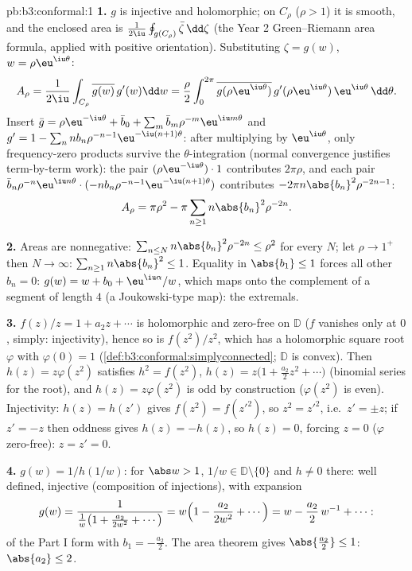 \begin{solution}{pb:b3:conformal:1}
\textbf{1.} $g$ is injective and holomorphic; on $C_\rho$
($\rho > 1$) it is smooth, and the enclosed area is
$\frac1{2\iu}\oint_{g(C_\rho)}\bar\zeta\,\dd\zeta$ (the Year 2
Green--Riemann area formula, applied with positive
orientation). Substituting $\zeta = g(w)$, $w =
\rho\eu^{\iu\theta}$:
\[
A_\rho = \frac1{2\iu}\int_{C_\rho}\overline{g(w)}\,g'(w)\dd
w = \frac\rho2\int_0^{2\pi}\overline{g(\rho\eu^{\iu\theta})}
\,g'(\rho\eu^{\iu\theta})\,\eu^{\iu\theta}\,\dd\theta .
\]
Insert $\bar g = \rho\eu^{-\iu\theta} + \bar b_0 +
\sum_m\bar b_m\rho^{-m}\eu^{\iu m\theta}$ and $g' = 1 -
\sum_nnb_n\rho^{-n-1}\eu^{-\iu(n+1)\theta}$: after
multiplying by $\eu^{\iu\theta}$, only frequency-zero
products survive the $\theta$-integration (normal
convergence justifies term-by-term work): the pair
$(\rho\eu^{-\iu\theta})\cdot1$ contributes $2\pi\rho$, and
each pair $\bar b_n\rho^{-n}\eu^{\iu
n\theta}\cdot(-nb_n\rho^{-n-1}\eu^{-\iu(n+1)\theta})$
contributes $-2\pi n\abs{b_n}^2\rho^{-2n-1}$:
\[
A_\rho = \pi\rho^2 - \pi\sum_{n\geq1}n\abs{b_n}^2\rho^{-2n}.
\]

\textbf{2.} Areas are nonnegative: $\sum_{n\leq
N}n\abs{b_n}^2\rho^{-2n} \leq \rho^2$ for every $N$; let
$\rho \to 1^+$ then $N \to \infty$:
$\sum_{n\geq1}n\abs{b_n}^2 \leq 1$. Equality in $\abs{b_1}
\leq 1$ forces all other $b_n = 0$: $g(w) = w + b_0 +
\eu^{\iu\alpha}/w$, which maps onto the complement of a
segment of length $4$ (a Joukowski-type map): the extremals.

\textbf{3.} $f(z)/z = 1 + a_2z + \cdots$ is holomorphic and
zero-free on $\mathbb D$ ($f$ vanishes only at $0$, simply:
injectivity), hence so is $f(z^2)/z^2$, which has a
holomorphic square root $\varphi$ with $\varphi(0) = 1$
(\cref{def:b3:conformal:simplyconnected}; $\mathbb D$ is
convex). Then $h(z) = z\varphi(z^2)$ satisfies $h^2 =
f(z^2)$, $h(z) = z\bigl(1 + \frac{a_2}2z^2 + \cdots\bigr)$
(binomial series for the root), and $h(z) = z\varphi(z^2)$ is
odd by construction ($\varphi(z^2)$ is even). Injectivity: $h(z) = h(z')$ gives $f(z^2) =
f(z'^2)$, so $z^2 = z'^2$, i.e.\ $z' = \pm z$; if $z' = -z$
then oddness gives $h(z) = -h(z)$, so $h(z) = 0$, forcing $z
= 0$ ($\varphi$ zero-free): $z = z' = 0$.

\textbf{4.} $g(w) = 1/h(1/w)$: for $\abs w > 1$, $1/w \in
\mathbb D\setminus\{0\}$ and $h \neq 0$ there: well defined,
injective (composition of injections), with expansion
\[
g(w) = \frac{1}{\frac1w\bigl(1 + \frac{a_2}{2w^2} +
\cdots\bigr)} = w\Bigl(1 - \frac{a_2}{2w^2} + \cdots\Bigr)
= w - \frac{a_2}{2}\,w^{-1} + \cdots :
\]
of the Part I form with $b_1 = -\frac{a_2}2$. The area theorem
gives $\abs{\frac{a_2}2} \leq 1$: $\abs{a_2} \leq 2$.


\end{solution}
